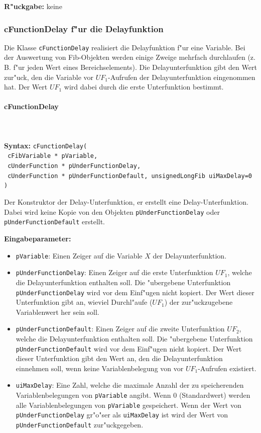 \bigskip\noindent
\textbf{R"uckgabe:} keine


\subsubsection{cFunctionDelay f"ur die Delayfunktion}

Die Klasse \verb|cFunctionDelay| realisiert die Delayfunktion f"ur eine Variable. Bei der Auswertung von Fib-Objekten werden einige Zweige mehrfach durchlaufen (z. B. f"ur jeden Wert eines Bereichselements). Die Delayunterfunktion gibt den Wert zur"uck, den die Variable vor $UF_1$-Aufrufen der Delayunterfunktion eingenommen hat. Der Wert $UF_1$ wird dabei durch die erste Unterfunktion bestimmt.

\paragraph{cFunctionDelay}

\ \\\\\noindent
\textbf{Syntax:} \verb|cFunctionDelay(| \\\verb| cFibVariable * pVariable,| \\\verb| cUnderFunction * pUnderFunctionDelay,| \\\verb| cUnderFunction * pUnderFunctionDefault, unsignedLongFib uiMaxDelay=0 )|

\bigskip\noindent
Der Konstruktor der Delay-Unterfunktion, er erstellt eine Delay-Unterfunktion.
Dabei wird keine Kopie von den Objekten \verb|pUnderFunctionDelay| oder \verb|pUnderFunctionDefault| erstellt.

\bigskip\noindent
\textbf{Eingabeparameter:}
\begin{itemize}
 \item \verb|pVariable|: Einen Zeiger auf die Variable $X$ der Delayunterfunktion.
 \item \verb|pUnderFunctionDelay|: Einen Zeiger auf die erste Unterfunktion $UF_1$, welche die Delayunterfunktion enthalten soll. Die "ubergebene Unterfunktion \verb|pUnderFunctionDelay| wird vor dem Einf"ugen nicht kopiert. Der Wert dieser Unterfunktion gibt an, wieviel Durchl"aufe ($UF_1$) der zur"uckzugebene Variablenwert her sein soll.
 \item \verb|pUnderFunctionDefault|: Einen Zeiger auf die zweite Unterfunktion $UF_2$, welche die Delayunterfunktion enthalten soll. Die "ubergebene Unterfunktion \verb|pUnderFunctionDefault| wird vor dem Einf"ugen nicht kopiert. Der Wert dieser Unterfunktion gibt den Wert an, den die Delayunterfunktion einnehmen soll, wenn keine Variablenbelegung von vor $UF_1$-Aufrufen existiert.
 \item \verb|uiMaxDelay|: Eine Zahl, welche die maximale Anzahl der zu speicherenden Variablenbelegungen von \verb|pVariable| angibt. Wenn 0 (Standardwert) werden alle Variablenbelegungen von \verb|pVariable| gespeichert. Wenn der Wert von \verb|pUnderFunctionDelay| gr"o"ser als \verb|uiMaxDelay| ist wird der Wert von \verb|pUnderFunctionDefault| zur"uckgegeben.
\end{itemize}

